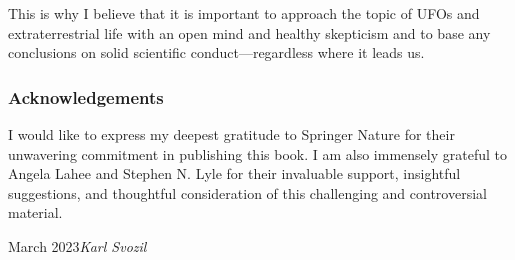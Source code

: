 This is why I believe that it is important to approach the topic of UFOs and extraterrestrial life with an open mind and healthy skepticism and to base any conclusions on solid scientific conduct---regardless where it leads us.

\subsubsection*{Acknowledgements}

I would like to express my deepest gratitude to Springer Nature for their unwavering commitment in publishing this book. I am also immensely grateful to Angela Lahee and Stephen N. Lyle for their invaluable support, insightful suggestions, and thoughtful consideration of this challenging and controversial material.





\vspace{\baselineskip}
\begin{flushright}\noindent
March 2023\hfill {\it Karl  Svozil}\\
\end{flushright}
